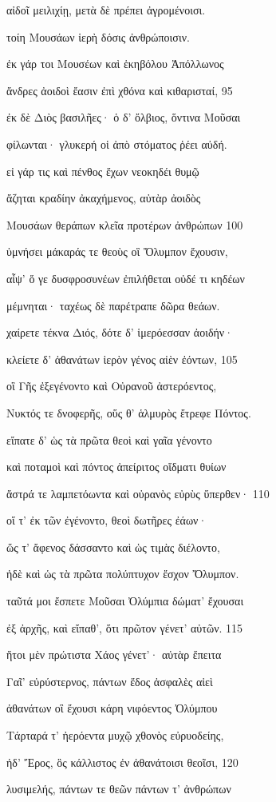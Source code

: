 αἰδοῖ μειλιχίῃ, μετὰ δὲ πρέπει ἀγρομένοισι. 

τοίη Μουσάων ἱερὴ δόσις ἀνθρώποισιν.

ἐκ γάρ τοι Μουσέων καὶ ἑκηβόλου Ἀπόλλωνος

ἄνδρες ἀοιδοὶ ἔασιν ἐπὶ χθόνα καὶ κιθαρισταί, \num{95}

ἐκ δὲ Διὸς βασιλῆες· ὁ δ' ὄλβιος, ὅντινα Μοῦσαι

φίλωνται· γλυκερή οἱ ἀπὸ στόματος ῥέει αὐδή. 

εἰ γάρ τις καὶ πένθος ἔχων νεοκηδέι θυμῷ

ἄζηται κραδίην ἀκαχήμενος, αὐτὰρ ἀοιδὸς

Μουσάων θεράπων κλεῖα προτέρων ἀνθρώπων \num{100} 

ὑμνήσει μάκαράς τε θεοὺς οἳ Ὄλυμπον ἔχουσιν, 

αἶψ' ὅ γε δυσφροσυνέων ἐπιλήθεται οὐδέ τι κηδέων

μέμνηται· ταχέως δὲ παρέτραπε δῶρα θεάων. 

χαίρετε τέκνα Διός, δότε δ' ἱμερόεσσαν ἀοιδήν· 

κλείετε δ' ἀθανάτων ἱερὸν γένος αἰὲν ἐόντων, \num{105}

οἳ Γῆς ἐξεγένοντο καὶ Οὐρανοῦ ἀστερόεντος,

Νυκτός τε δνοφερῆς, οὕς θ' ἁλμυρὸς ἔτρεφε Πόντος.

εἴπατε δ' ὡς τὰ πρῶτα θεοὶ καὶ γαῖα γένοντο 

καὶ ποταμοὶ καὶ πόντος ἀπείριτος οἴδματι θυίων 

ἄστρά τε λαμπετόωντα καὶ οὐρανὸς εὐρὺς ὕπερθεν· \num{110} 

οἵ τ' ἐκ τῶν ἐγένοντο, θεοὶ δωτῆρες ἐάων· 

ὥς τ' ἄφενος δάσσαντο καὶ ὡς τιμὰς διέλοντο, 

ἠδὲ καὶ ὡς τὰ πρῶτα πολύπτυχον ἔσχον Ὄλυμπον.

ταῦτά μοι ἔσπετε Μοῦσαι Ὀλύμπια δώματ' ἔχουσαι 

ἐξ ἀρχῆς, καὶ εἴπαθ', ὅτι πρῶτον γένετ' αὐτῶν. \num{115}

ἤτοι μὲν πρώτιστα Χάος γένετ'· αὐτὰρ ἔπειτα

Γαῖ' εὐρύστερνος, πάντων ἕδος ἀσφαλὲς αἰεὶ

ἀθανάτων οἳ ἔχουσι κάρη νιφόεντος Ὀλύμπου 

Τάρταρά τ' ἠερόεντα μυχῷ χθονὸς εὐρυοδείης,

ἠδ' Ἔρος, ὃς κάλλιστος ἐν ἀθανάτοισι θεοῖσι, \num{120}

λυσιμελής, πάντων τε θεῶν πάντων τ' ἀνθρώπων

